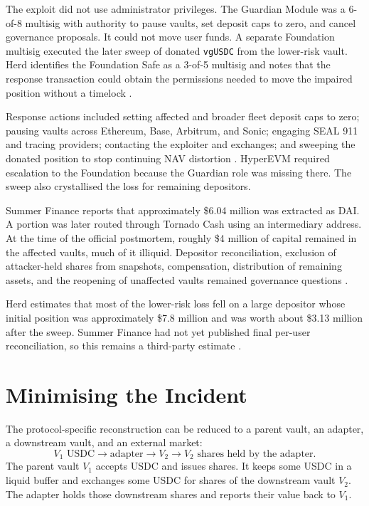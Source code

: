 \documentclass[11pt]{article}
\begin{document}
The exploit did not use administrator privileges.  The Guardian Module was a 6-of-8 multisig with authority to pause vaults, set deposit caps to zero, and cancel governance proposals.  It could not move user funds.  A separate Foundation multisig executed the later sweep of donated \texttt{vgUSDC} from the lower-risk vault.  Herd identifies the Foundation Safe as a 3-of-5 multisig and notes that the response transaction could obtain the permissions needed to move the impaired position without a timelock \cite{herd-analysis,guardian-report}.

Response actions included setting affected and broader fleet deposit caps to zero; pausing vaults across Ethereum, Base, Arbitrum, and Sonic; engaging SEAL 911 and tracing providers; contacting the exploiter and exchanges; and sweeping the donated position to stop continuing NAV distortion \cite{sweep-transaction}.  HyperEVM required escalation to the Foundation because the Guardian role was missing there.  The sweep also crystallised the loss for remaining depositors.

Summer Finance reports that approximately \$6.04 million was extracted as DAI.  A portion was later routed through Tornado Cash using an intermediary address.  At the time of the official postmortem, roughly \$4 million of capital remained in the affected vaults, much of it illiquid.  Depositor reconciliation, exclusion of attacker-held shares from snapshots, compensation, distribution of remaining assets, and the reopening of unaffected vaults remained governance questions \cite{summer-postmortem}.

Herd estimates that most of the lower-risk loss fell on a large depositor whose initial position was approximately \$7.8 million and was worth about \$3.13 million after the sweep.  Summer Finance had not yet published final per-user reconciliation, so this remains a third-party estimate \cite{herd-analysis}.

\section{Minimising the Incident}

The protocol-specific reconstruction can be reduced to a parent vault, an adapter, a downstream vault, and an external market:
\begin{equation}
    V_1\text{ USDC}
    \longrightarrow \text{adapter}
    \longrightarrow V_2
    \longrightarrow V_2\text{ shares held by the adapter}.
\end{equation}
The parent vault $V_1$ accepts USDC and issues shares.  It keeps some USDC in a liquid buffer and exchanges some USDC for shares of the downstream vault $V_2$.  The adapter holds those downstream shares and reports their value back to $V_1$.
\end{document}
